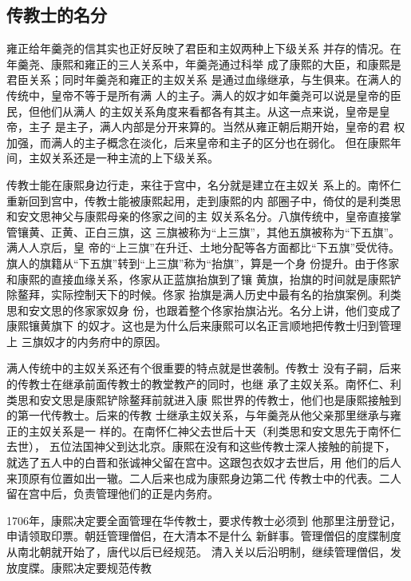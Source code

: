 \subsection{传教士的名分}
\par
雍正给年羹尧的信其实也正好反映了君臣和主奴两种上下级关系%
并存的情况。在年羹尧、康熙和雍正的三人关系中，年羹尧通过科举%
成了康熙的大臣，和康熙是君臣关系；同时年羹尧和雍正的主奴关系%
是通过血缘继承，与生俱来。在满人的传统中，皇帝不等于是所有满%
人的主子。满人的奴才如年羹尧可以说是皇帝的臣民，但他们从满人%
的主奴关系角度来看都各有其主。从这一点来说，皇帝是皇帝，主子%
是主子，满人内部是分开来算的。当然从雍正朝后期开始，皇帝的君%
权加强，而满人的主子概念在淡化，后来皇帝和主子的区分也在弱化。%
但在康熙年间，主奴关系还是一种主流的上下级关系。%
\par
传教士能在康熙身边行走，来往于宫中，名分就是建立在主奴关%
系上的。南怀仁重新回到宫中，传教士能被康熙起用，走到康熙的内%
部圈子中，倚仗的是利类思和安文思神父与康熙母亲的佟家之间的主%
奴关系名分。八旗传统中，皇帝直接掌管镶黄、正黄、正白三旗，这%
三旗被称为“上三旗”，其他五旗被称为“下五旗”。满人人京后，皇%
帝的“上三旗”在升迁、土地分配等各方面都比“下五旗”受优待。%
旗人的旗籍从“下五旗”转到“上三旗”称为“抬旗”，算是一个身%
份提升。由于佟家和康熙的直接血缘关系，佟家从正蓝旗抬旗到了镶%
黄旗，抬旗的时间就是康熙铲除鳌拜，实际控制天下的时候。佟家%
抬旗是满人历史中最有名的抬旗案例。利类思和安文思的佟家家奴身%
份，也跟着整个佟家抬旗沾光。名分上讲，他们变成了康熙镶黄旗下%
的奴才。这也是为什么后来康熙可以名正言顺地把传教士归到管理上%
三旗奴才的内务府中的原因。%
\par
满人传统中的主奴关系还有个很重要的特点就是世袭制。传教士%
没有子嗣，后来的传教士在继承前面传教士的教堂教产的同时，也继%
承了主奴关系。南怀仁、利类思和安文思是康熙铲除鳌拜前就进入康%
熙世界的传教士，他们也是康熙接触到的第一代传教士。后来的传教%
士继承主奴关系，与年羹尧从他父亲那里继承与雍正的主奴关系是一%
样的。在南怀仁神父去世后十天（利类思和安文思先于南怀仁去世），%
五位法国神父到达北京。康熙在没有和这些传教士深人接触的前提下，%
就选了五人中的白晋和张诚神父留在宫中。这跟包衣奴才去世后，用%
他们的后人来顶原有位置如出一辙。二人后来也成为康熙身边第二代%
传教士中的代表。二人留在宫中后，负责管理他们的正是内务府。%
\par
1706年，康熙决定要全面管理在华传教士，要求传教士必须到%
他那里注册登记，申请领取印票。朝廷管理僧侣，在大清本不是什么%
新鲜事。管理僧侣的度牒制度从南北朝就开始了，唐代以后已经规范。%
清入关以后沿明制，继续管理僧侣，发放度牒。康熙决定要规范传教%
